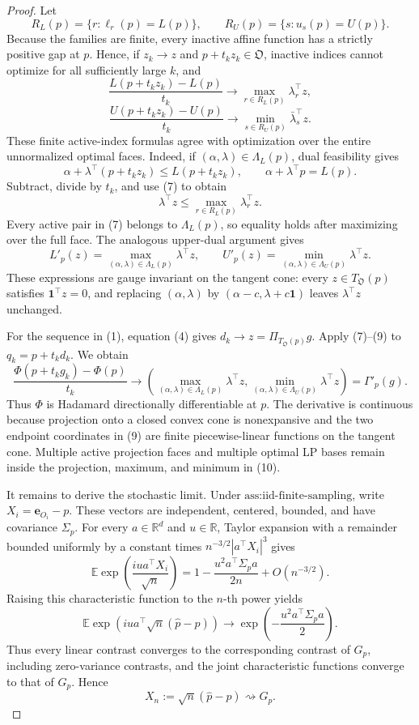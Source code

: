 \documentclass{article}
\begin{document}
\begin{proof}
Let
\[
R_L(p)=\{r:\ell_r(p)=L(p)\},
\qquad
R_U(p)=\{s:u_s(p)=U(p)\}.
\]
Because the families are finite, every inactive affine function has a strictly positive gap at \(p\).  Hence, if \(z_k\to z\) and \(p+t_kz_k\in\mathfrak O\), inactive indices cannot optimize for all sufficiently large \(k\), and
\[
\frac{L(p+t_kz_k)-L(p)}{t_k}
\longrightarrow\max_{r\in R_L(p)}\lambda_r^{\top}z,
\tag{7}
\]
\[
\frac{U(p+t_kz_k)-U(p)}{t_k}
\longrightarrow\min_{s\in R_U(p)}\bar\lambda_s^{\top}z.
\tag{8}
\]
These finite active-index formulas agree with optimization over the entire unnormalized optimal faces.  Indeed, if \((\alpha,\lambda)\in\Lambda_L(p)\), dual feasibility gives
\[
\alpha+\lambda^{\top}(p+t_kz_k)\leq L(p+t_kz_k),
\qquad
\alpha+\lambda^{\top}p=L(p).
\]
Subtract, divide by \(t_k\), and use (7) to obtain
\[
\lambda^{\top}z\leq\max_{r\in R_L(p)}\lambda_r^{\top}z.
\]
Every active pair in (7) belongs to \(\Lambda_L(p)\), so equality holds after maximizing over the full face.  The analogous upper-dual argument gives
\[
L'_p(z)=\max_{(\alpha,\lambda)\in\Lambda_L(p)}\lambda^{\top}z,
\qquad
U'_p(z)=\min_{(\alpha,\lambda)\in\Lambda_U(p)}\lambda^{\top}z.
\tag{9}
\]
These expressions are gauge invariant on the tangent cone: every \(z\in T_{\mathfrak O}(p)\) satisfies \(\mathbf 1^{\top}z=0\), and replacing \((\alpha,\lambda)\) by \((\alpha-c,\lambda+c\mathbf 1)\) leaves \(\lambda^{\top}z\) unchanged.

For the sequence in (1), equation (4) gives \(d_k\to z=\Pi_{T_{\mathfrak O}(p)}g\).  Apply (7)--(9) to \(q_k=p+t_kd_k\).  We obtain
\[
\frac{\Phi(p+t_kg_k)-\Phi(p)}{t_k}
\longrightarrow
\left(
\max_{(\alpha,\lambda)\in\Lambda_L(p)}\lambda^{\top}z,
\min_{(\alpha,\lambda)\in\Lambda_U(p)}\lambda^{\top}z
\right)
=\Gamma'_p(g).
\tag{10}
\]
Thus \(\Phi\) is Hadamard directionally differentiable at \(p\).  The derivative is continuous because projection onto a closed convex cone is nonexpansive and the two endpoint coordinates in (9) are finite piecewise-linear functions on the tangent cone.  Multiple active projection faces and multiple optimal LP bases remain inside the projection, maximum, and minimum in (10).

It remains to derive the stochastic limit.  Under \(\text{ass:iid-finite-sampling}\), write \(X_i=\mathbf e_{O_i}-p\).  These vectors are independent, centered, bounded, and have covariance \(\Sigma_p\).  For every \(a\in\mathbb R^d\) and \(u\in\mathbb R\), Taylor expansion with a remainder bounded uniformly by a constant times \(n^{-3/2}|a^{\top}X_i|^3\) gives
\[
\mathbb E\exp\!\left(\frac{iu a^{\top}X_i}{\sqrt n}\right)
=1-\frac{u^2a^{\top}\Sigma_pa}{2n}+O(n^{-3/2}).
\]
Raising this characteristic function to the \(n\)-th power yields
\[
\mathbb E\exp\!\left(iu a^{\top}\sqrt n(\widehat p-p)\right)
\longrightarrow\exp\!\left(-\frac{u^2a^{\top}\Sigma_pa}{2}\right).
\tag{11}
\]
Thus every linear contrast converges to the corresponding contrast of \(G_p\), including zero-variance contrasts, and the joint characteristic functions converge to that of \(G_p\).  Hence
\[
X_n:=\sqrt n(\widehat p-p)\rightsquigarrow G_p.
\tag{12}
\]


\end{proof}
\end{document}
